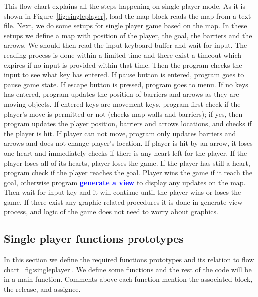 This flow chart explains all the steps happening on single player mode. 
As it is shown in Figure~\ref{fig:singleplayer}, load the map block reads the map from a text file. Next, we do some setups for single player game based on the map. In these setups we define a map with position of the player, the goal, the barriers and the arrows.
We should then read the input keyboard buffer and wait for input. The reading process is done within a limited time and there exist a timeout which expires if no input is provided within that time. Then the program checks the input to see what key has entered. If pause button is entered, program goes to pause game state. If escape button is pressed, program goes to menu. If no keys has entered, program updates the position of barriers and arrows as they are moving objects. If entered keys are movement keys, program first check if the player's move is permitted or not (checks map walls and barriers); if yes, then program updates the player position, barriers and arrows locations, and checks if the player is hit. If player can not move, program only updates barriers and arrows and does not change player's location. If player is hit by an arrow, it loses one heart and immediately checks if there is any heart left for the player. If the player loses all of its hearts, player loses the game. If the player has still a heart, program check if the player reaches the goal. Player wins the game if it reach the goal, otherwise program \textcolor{blue}{\bf generate a view} to display any updates on the map. Then wait for input key and it will continue until the player wins or loses the game.
If there exist any graphic related procedures it is done in generate view process, and logic of the game does not need to worry about graphics.

\subsection{Single player functions prototypes}
In this section we define the required functions prototypes and its relation to flow chart~\ref{fig:singleplayer}. We define some functions and the rest of the code will be in a main function. Comments above each function mention the associated block, the release, and assignee.

